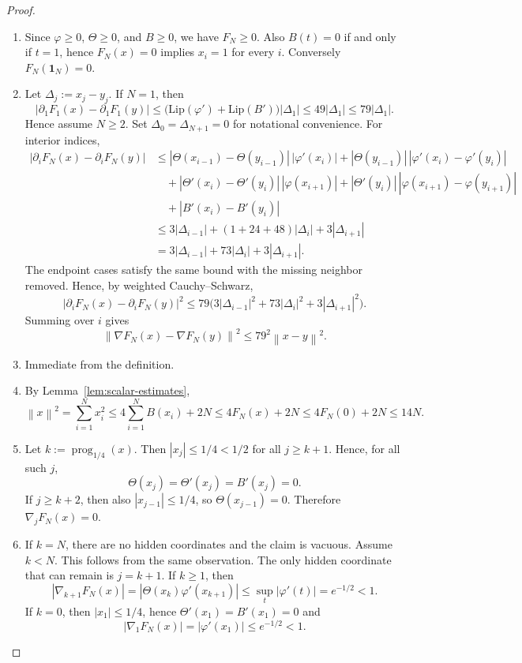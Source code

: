 \documentclass[11pt]{article}
\newcommand{\norm}[1]{\left\lVert #1\right\rVert}
\newcommand{\prog}{\operatorname{prog}}
\newcommand{\one}{\mathbf{1}}
\begin{document}
\begin{proof}
\begin{enumerate}[label=(\arabic*),leftmargin=1.5em]
\item Since $\varphi\ge 0$, $\Theta\ge 0$, and $B\ge 0$, we have $F_N\ge 0$.
Also $B(t)=0$ if and only if $t=1$, hence $F_N(x)=0$ implies $x_i=1$ for every $i$.
Conversely $F_N(\one_N)=0$.

\item Let $\Delta_j:=x_j-y_j$.
If \(N=1\), then
\[
|\partial_1F_1(x)-\partial_1F_1(y)|
\le
\bigl(\mathrm{Lip}(\varphi')+\mathrm{Lip}(B')\bigr)|\Delta_1|
\le 49|\Delta_1|
\le 79|\Delta_1|.
\]
Hence assume \(N\ge2\). Set \(\Delta_0=\Delta_{N+1}=0\) for notational convenience.
For interior indices,
\[
\begin{aligned}
|\partial_i F_N(x)-\partial_i F_N(y)|
&\le
|\Theta(x_{i-1})-\Theta(y_{i-1})|\,|\varphi'(x_i)|
+|\Theta(y_{i-1})|\,|\varphi'(x_i)-\varphi'(y_i)|\\
&\quad
+|\Theta'(x_i)-\Theta'(y_i)|\,|\varphi(x_{i+1})|
+|\Theta'(y_i)|\,|\varphi(x_{i+1})-\varphi(y_{i+1})|\\
&\quad
+|B'(x_i)-B'(y_i)|\\
&\le
3|\Delta_{i-1}|+(1+24+48)|\Delta_i|+3|\Delta_{i+1}|\\
&=
3|\Delta_{i-1}|+73|\Delta_i|+3|\Delta_{i+1}|.
\end{aligned}
\]
The endpoint cases satisfy the same bound with the missing neighbor removed.
Hence, by weighted Cauchy--Schwarz,
\[
|\partial_i F_N(x)-\partial_i F_N(y)|^2
\le
79\bigl(3|\Delta_{i-1}|^2+73|\Delta_i|^2+3|\Delta_{i+1}|^2\bigr).
\]
Summing over $i$ gives
\[
\norm{\nabla F_N(x)-\nabla F_N(y)}^2\le 79^2\norm{x-y}^2.
\]

\item Immediate from the definition.

\item By Lemma~\ref{lem:scalar-estimates},
\[
\norm{x}^2=\sum_{i=1}^N x_i^2\le 4\sum_{i=1}^N B(x_i)+2N\le 4F_N(x)+2N\le 4F_N(0)+2N\le 14N.
\]

\item Let $k:=\prog_{1/4}(x)$.
Then $|x_j|\le 1/4<1/2$ for all $j\ge k+1$.
Hence, for all such $j$,
\[
\Theta(x_j)=\Theta'(x_j)=B'(x_j)=0.
\]
If $j\ge k+2$, then also $|x_{j-1}|\le 1/4$, so $\Theta(x_{j-1})=0$.
Therefore $\nabla_j F_N(x)=0$.

\item If \(k=N\), there are no hidden coordinates and the claim is vacuous. Assume \(k<N\).
This follows from the same observation.
The only hidden coordinate that can remain is $j=k+1$.
If $k\ge 1$, then
\[
|\nabla_{k+1}F_N(x)|
=
|\Theta(x_k)\varphi'(x_{k+1})|
\le
\sup_t |\varphi'(t)|
=
e^{-1/2}
<1.
\]
If $k=0$, then $|x_1|\le 1/4$, hence $\Theta'(x_1)=B'(x_1)=0$ and
\[
|\nabla_1F_N(x)|=|\varphi'(x_1)|\le e^{-1/2}<1.
\]
\end{enumerate}
\end{proof}
\end{document}
